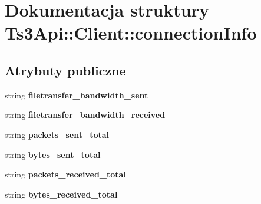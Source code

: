 \hypertarget{struct_ts3_api_1_1_client_1_1connection_info}{}\section{Dokumentacja struktury Ts3\+Api\+:\+:Client\+:\+:connection\+Info}
\label{struct_ts3_api_1_1_client_1_1connection_info}
\subsection*{Atrybuty publiczne}
\begin{DoxyCompactItemize}
\item 
string {\bfseries filetransfer\+\_\+bandwidth\+\_\+sent}\hypertarget{struct_ts3_api_1_1_client_1_1connection_info_af83775ea9aa65c99ba6bae8c3b75e311}{}\label{struct_ts3_api_1_1_client_1_1connection_info_af83775ea9aa65c99ba6bae8c3b75e311}

\item 
string {\bfseries filetransfer\+\_\+bandwidth\+\_\+received}\hypertarget{struct_ts3_api_1_1_client_1_1connection_info_aa8cfdea946a89bd88fb57e2833e72497}{}\label{struct_ts3_api_1_1_client_1_1connection_info_aa8cfdea946a89bd88fb57e2833e72497}

\item 
string {\bfseries packets\+\_\+sent\+\_\+total}\hypertarget{struct_ts3_api_1_1_client_1_1connection_info_aa822f6e44c8580a4814dd9dfc9c55ef2}{}\label{struct_ts3_api_1_1_client_1_1connection_info_aa822f6e44c8580a4814dd9dfc9c55ef2}

\item 
string {\bfseries bytes\+\_\+sent\+\_\+total}\hypertarget{struct_ts3_api_1_1_client_1_1connection_info_a6bfc306d8060781261c2aa28b395f5df}{}\label{struct_ts3_api_1_1_client_1_1connection_info_a6bfc306d8060781261c2aa28b395f5df}

\item 
string {\bfseries packets\+\_\+received\+\_\+total}\hypertarget{struct_ts3_api_1_1_client_1_1connection_info_ae6ccbb4cf1cbca10fa890ae86ecc3e29}{}\label{struct_ts3_api_1_1_client_1_1connection_info_ae6ccbb4cf1cbca10fa890ae86ecc3e29}

\item 
string {\bfseries bytes\+\_\+received\+\_\+total}\hypertarget{struct_ts3_api_1_1_client_1_1connection_info_a1448f2fa44e9f33206d6d166f044a718}{}\label{struct_ts3_api_1_1_client_1_1connection_info_a1448f2fa44e9f33206d6d166f044a718}


\end{DoxyCompactItemize}
